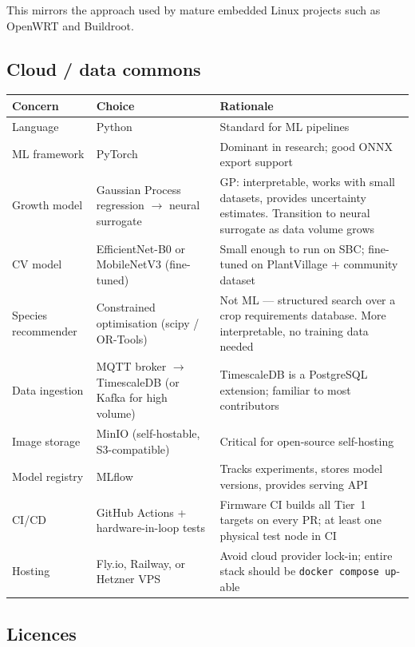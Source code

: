 This mirrors the approach used by mature embedded Linux projects such as OpenWRT and Buildroot.

\subsection{Cloud / data commons}

\begin{center}
\begin{tabular}{p{3.5cm}p{4cm}p{5.5cm}}
\toprule
\textbf{Concern} & \textbf{Choice} & \textbf{Rationale} \\
\midrule
Language & Python & Standard for ML pipelines \\
ML framework & PyTorch & Dominant in research; good ONNX export support \\
Growth model & Gaussian Process regression $\to$ neural surrogate & GP: interpretable, works with small datasets, provides uncertainty estimates. Transition to neural surrogate as data volume grows \\
CV model & EfficientNet-B0 or MobileNetV3 (fine-tuned) & Small enough to run on SBC; fine-tuned on PlantVillage + community dataset \\
Species recommender & Constrained optimisation (scipy / OR-Tools) & Not ML --- structured search over a crop requirements database. More interpretable, no training data needed \\
Data ingestion & MQTT broker $\to$ TimescaleDB (or Kafka for high volume) & TimescaleDB is a PostgreSQL extension; familiar to most contributors \\
Image storage & MinIO (self-hostable, S3-compatible) & Critical for open-source self-hosting \\
Model registry & MLflow & Tracks experiments, stores model versions, provides serving API \\
CI/CD & GitHub Actions + hardware-in-loop tests & Firmware CI builds all Tier~1 targets on every PR; at least one physical test node in CI \\
Hosting & Fly.io, Railway, or Hetzner VPS & Avoid cloud provider lock-in; entire stack should be \texttt{docker compose up}-able \\
\bottomrule
\end{tabular}
\end{center}

\subsection{Licences}

